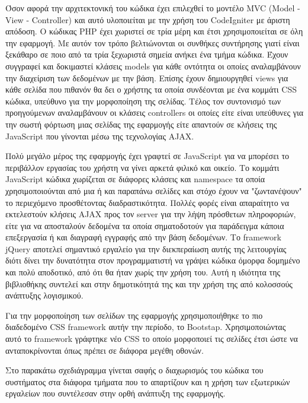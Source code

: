 Όσον αφορά την αρχιτεκτονική του κώδικα έχει επιλεχθεί το μοντέλο MVC (Model - View - Controller) και αυτό υλοποιείται με την χρήση του CodeIgniter με άριστη απόδοση. Ο κώδικας PHP έχει χωριστεί σε τρία μέρη και έτσι χρησιμοποιείται σε όλη την εφαρμογή. Με αυτόν τον τρόπο βελτιώνονται οι συνθήκες συντήρησης γιατί είναι ξεκάθαρο σε ποιο από τα τρία ξεχωριστά σημεία ανήκει ένα τμήμα κώδικα. Έχουν συγγραφεί και δοκιμαστεί κλάσεις models για κάθε οντότητα οι οποίες αναλαμβάνουν την διαχείριση των δεδομένων με την βάση. Επίσης έχουν δημιουργηθεί views για κάθε σελίδα που πιθανόν θα δει ο χρήστης τα οποία συνδέονται με ένα κομμάτι CSS κώδικα, υπεύθυνο για την μορφοποίηση της σελίδας. Τέλος τον συντονισμό των προηγούμενων αναλαμβάνουν οι κλάσεις controllers οι οποίες είτε είναι υπεύθυνες για την  σωστή φόρτωση μιας σελίδας της εφαρμογής είτε απαντούν σε κλήσεις της JavaScript που γίνονται μέσω της τεχνολογίας AJAX.

Πολύ μεγάλο μέρος της εφαρμογής έχει γραφτεί σε JavaScript για να μπορέσει το περιβάλλον εργασίας του χρήστη να γίνει αρκετά φιλικό και οικείο. Το κομμάτι JavaScript κώδικα χωρίζεται σε διάφορες κλάσεις και namespace τα οποία χρησιμοποιούνται από μια ή και παραπάνω σελίδες και στόχο έχουν να "ζωντανέψουν" το περιεχόμενο προσθέτοντας διαδραστικότητα. Πολλές φορές είναι απαραίτητο να εκτελεστούν κλήσεις AJAX προς τον server για την λήψη πρόσθετων πληροφοριών, είτε για να αποσταλούν δεδομένα τα οποία σηματοδοτούν για παράδειγμα κάποια επεξεργασία ή και διαγραφή εγγραφής από την βάση δεδομένων. Το framework jQuery αποτελεί σημαντικό εργαλείο για την διεκπεραίωση αυτής της λειτουργίας διότι δίνει την δυνατότητα στον προγραμματιστή να γράψει κώδικα όμορφα δομημένο και πολύ αποδοτικό, από ότι θα ήταν χωρίς την χρήση του. Αυτή η ιδιότητα της βιβλιοθήκης συντελεί και στην δημοτικότητά της και την χρήση της από κολοσσούς ανάπτυξης λογισμικού.

Για την μορφοποίηση των σελίδων της εφαρμογής χρησιμοποιήθηκε το πιο διαδεδομένο CSS framework αυτήν την περίοδο, το Bootstap. Χρησιμοποιώντας αυτό το framework γράφτηκε νέο CSS το οποίο μορφοποιεί τις σελίδες έτσι ώστε να ανταποκρίνονται όπως πρέπει σε διάφορα μεγέθη οθονών.

Στο παρακάτω σχεδιάγραμμα γίνεται σαφής ο διαχωρισμός του κώδικα του συστήματος στα διάφορα τμήματα που το απαρτίζουν και η χρήση των εξωτερικών εργαλείων που συντέλεσαν στην ορθή ανάπτυξη της εφαρμογής.

